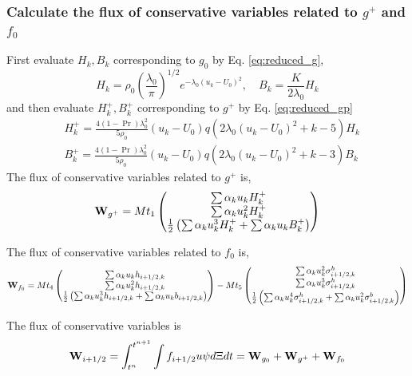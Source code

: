 \documentclass[a4paper]{book}
\begin{document}
\subsubsection*{Calculate the flux of conservative variables related to $g^+$ and $f_0$}
First evaluate $H_k,B_k$ corresponding to $g_0$ by Eq. \ref{eq:reduced_g},
$$H_k = \rho_0\left(\frac{\lambda_0}{\pi}\right)^{1/2}e^{-\lambda_0(u_k-U_0)^2},\quad B_k = \frac{K}{2\lambda_0}H_k$$
and then evaluate $H_{k}^+,B_{k}^+$ corresponding to $g^+$ by Eq. \ref{eq:reduced_gp}
$$
\begin{aligned}
    & H_k^+ = \frac{4(1-\Pr)\lambda_0^2}{5\rho_0}(u_k-U_0)q(2\lambda_0(u_k-U_0)^2+k-5)H_k\\
    & B_k^+ = \frac{4(1-\Pr)\lambda_0^2}{5\rho_0}(u_k-U_0)q(2\lambda_0(u_k-U_0)^2+k-3)B_k
\end{aligned}
$$
The flux of conservative variables related to $g^+$ is,
$$
{\bf W}_{g^+} = Mt_1
\begin{pmatrix}
    \sum\alpha_k u_k H_k^+\\ \sum\alpha_k u_k^2 H_k^+\\ \frac{1}{2}\left(\sum\alpha_k u_k^3 H_k^+ + \sum\alpha_k u_k B_k^+\right)
\end{pmatrix}
$$

The flux of conservative variables related to $f_0$ is,
$$
{\bf W}_{f_0} = Mt_4
\begin{pmatrix}
    \sum\alpha_k u_k h_{i+1/2,k}\\ \sum\alpha_k u_k^2 h_{i+1/2,k}\\ \frac{1}{2}\left(\sum\alpha_k u_k^3 h_{i+1/2,k}+\sum\alpha_k u_k b_{i+1/2,k}\right)
\end{pmatrix}
-Mt_5
\begin{pmatrix}
    \sum\alpha_k u_k^2 \sigma_{i+1/2,k}^h\\ \sum\alpha_k u_k^3 \sigma_{i+1/2,k}^h\\ \frac{1}{2}\left(\sum\alpha_k u_k^4 \sigma_{i+1/2,k}^h+\sum\alpha_k u_k^2 \sigma_{i+1/2,k}^b\right)
\end{pmatrix}
$$

The flux of conservative variables is
$${\bf W}_{i+1/2} = \int_{t^n}^{t^{n+1}}\int f_{i+1/2}u\psi d\Xi dt={\bf W}_{g_0}+{\bf W}_{g^+}+{\bf W}_{f_0}$$
\end{document}
